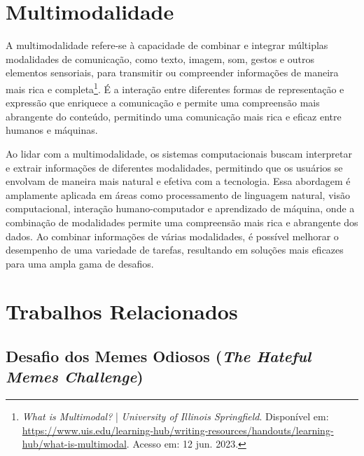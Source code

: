 \section{Multimodalidade}

A multimodalidade refere-se à capacidade de combinar e integrar múltiplas modalidades de comunicação, como texto, imagem, som, gestos e outros elementos sensoriais, para transmitir ou compreender informações de maneira mais rica e completa\footnote{\textit{What is Multimodal?} | \textit{University of Illinois Springfield}. Disponível em: \url{https://www.uis.edu/learning-hub/writing-resources/handouts/learning-hub/what-is-multimodal}. Acesso em: 12 jun. 2023.}. É a interação entre diferentes formas de representação e expressão que enriquece a comunicação e permite uma compreensão mais abrangente do conteúdo, permitindo uma comunicação mais rica e eficaz entre humanos e máquinas.

Ao lidar com a multimodalidade, os sistemas computacionais buscam interpretar e extrair informações de diferentes modalidades, permitindo que os usuários se envolvam de maneira mais natural e efetiva com a tecnologia. Essa abordagem é amplamente aplicada em áreas como processamento de linguagem natural, visão computacional, interação humano-computador e aprendizado de máquina, onde a combinação de modalidades permite uma compreensão mais rica e abrangente dos dados. Ao combinar informações de várias modalidades, é possível melhorar o desempenho de uma variedade de tarefas, resultando em soluções mais eficazes para uma ampla gama de desafios.


\section{Trabalhos Relacionados}


\subsection{Desafio dos Memes Odiosos (\textit{The Hateful Memes Challenge})} 


